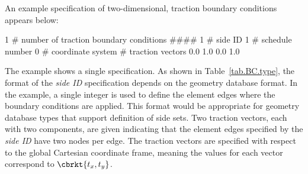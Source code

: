 An example specification of two-dimensional, traction boundary conditions appears below:
\begin{inputfile}
1	# number of traction boundary conditions
####
1  # side ID
1  # schedule number
0  # coordinate system 
# traction vectors
0.0  1.0   
0.0  1.0
\end{inputfile}
The example shows a single specification. As shown in Table~\ref{tab.BC.type}, the format of the \textit{side ID} specification depends on the geometry database format. In the example, a single integer is used to define the element edges where the boundary conditions are applied. This format would be appropriate for geometry database types that support definition of side sets. Two traction vectors, each with two components, are given indicating that the element edges specified by the \textit{side ID} have two nodes per edge. The traction vectors are specified with respect to the global Cartesian coordinate frame, meaning the values for each vector correspond to $\cbrkt{t_x, t_y}$.

